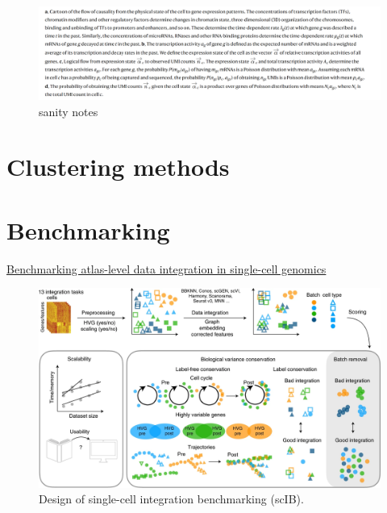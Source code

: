 \documentclass[
]{book}
\begin{document}
\begin{figure}
\centering
\includegraphics{./figs/singleCell/sanity_notes.png}
\caption{sanity notes}
\end{figure}

\hypertarget{clustering-methods}{%
\section{Clustering methods}\label{clustering-methods}}

\hypertarget{benchmarking}{%
\section{Benchmarking}\label{benchmarking}}

\href{https://www.nature.com/articles/s41592-021-01336-8}{Benchmarking atlas-level data integration in single-cell genomics}\citep{luecken2021benchmarking}

\begin{figure}
\centering
\includegraphics{./figs/singleCell/benchmarking1.jpg}
\caption{Design of single-cell integration benchmarking (scIB).}
\end{figure}
\end{document}
